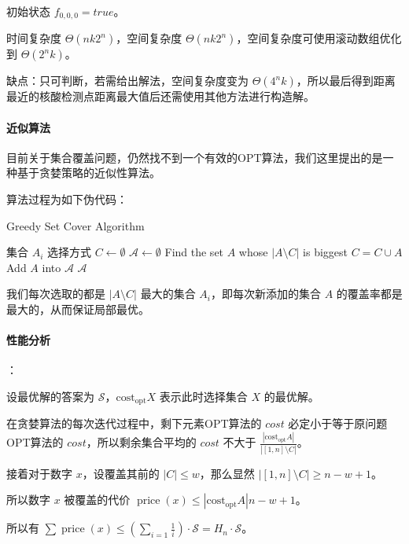 \documentclass{cumcmthesis}
\begin{document}
初始状态 $f_{0,0,0} = true$。

时间复杂度 $\Theta(nk2^n)$，空间复杂度 $\Theta(nk2^n)$，空间复杂度可使用滚动数组优化到 $\Theta(2^nk)$。

缺点：只可判断，若需给出解法，空间复杂度变为 $\Theta(4^nk)$，所以最后得到距离最近的核酸检测点距离最大值后还需使用其他方法进行构造解。

\paragraph{近似算法}

目前关于集合覆盖问题，仍然找不到一个有效的OPT算法，我们这里提出的是一种基于贪婪策略的近似性算法。

算法过程为如下伪代码：

\begin{algorithm}
    \caption{Greedy Set Cover Algorithm}
    \begin{algorithmic}[1]
        \Require 集合 $A_i$
        \Ensure 选择方式
        \State $C \gets \emptyset$
        \State $\mathscr{A} \gets \emptyset$
            \State Find the set $A$ whose $|A\setminus C|$ is biggest
            \State $C = C \cup A$
            \State Add $A$ into $\mathscr{A}$
        \EndWhile
        \State \Return $\mathscr{A}$
    \end{algorithmic}
\end{algorithm}

我们每次选取的都是 $|A\setminus C|$ 最大的集合 $A_i$，即每次新添加的集合 $A$ 的覆盖率都是最大的，从而保证局部最优。

\paragraph{性能分析}：

设最优解的答案为 $\mathscr{S}$，$\operatorname{cost_{opt}}X$ 表示此时选择集合 $X$ 的最优解。

在贪婪算法的每次迭代过程中，剩下元素OPT算法的 $cost$ 必定小于等于原问题OPT算法的 $cost$，所以剩余集合平均的 $cost$ 不大于 $\frac{|\operatorname{cost_{opt}}A|}{|[1,n]\setminus C|}$。

接着对于数字 $x$，设覆盖其前的 $|C| \le w$，那么显然 $|[1,n]\setminus C| \ge n - w + 1$。

所以数字 $x$ 被覆盖的代价 $\operatorname{price}(x) \le {|\operatorname{cost_{opt}}A|}{n-w+1}$。

所以有 $\sum \operatorname{price}(x) \le (\sum_{i=1}\frac{1}{i}) \cdot \mathscr{S} = H_n \cdot \mathscr{S}$。
\end{document}
